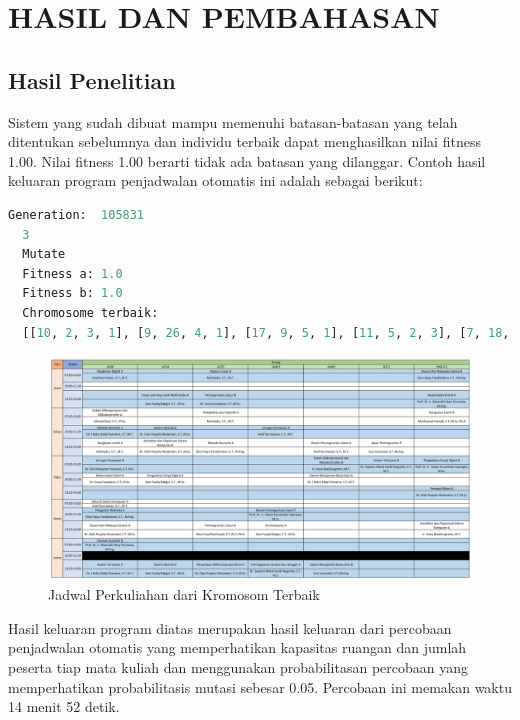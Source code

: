 \chapter{HASIL DAN PEMBAHASAN}
\label{chap:hasilpembahasan}



\section{Hasil Penelitian}
\label{sec:hasil penelitian}
Sistem yang sudah dibuat mampu memenuhi batasan-batasan yang telah ditentukan \linebreak sebelumnya dan individu terbaik dapat menghasilkan nilai fitness 1.00. Nilai fitness 1.00 \linebreak berarti tidak ada batasan yang dilanggar. Contoh hasil keluaran program penjadwalan otomatis ini adalah sebagai berikut:
 
\begin{lstlisting}[language=Python,caption={Output penjadwalan otomatis}]
  Generation:  105831
  3
  Mutate
  Fitness a: 1.0
  Fitness b: 1.0
  Chromosome terbaik: 
  [[10, 2, 3, 1], [9, 26, 4, 1], [17, 9, 5, 1], [11, 5, 2, 3], [7, 18, 3, 3], [6, 12, 5, 3], [10, 25, 3, 4], [15, 32, 4, 4], [12, 28, 5, 4], [2, 35, 2, 5], [3, 16, 4, 5], [9, 10, 6, 5], [9, 6, 7, 6], [14, 1, 1, 6], [17, 14, 3, 6], [2, 4, 2, 6], [10, 27, 4, 6], [13, 37, 1, 7], [4, 33, 7, 7], [5, 22, 5, 7], [1, 11, 4, 7], [11, 21, 2, 8], [7, 13, 4, 8], [3, 30, 7, 8], [2, 24, 5, 9], [9, 29, 4, 10], [17, 20, 4, 11], [5, 7, 6, 11], [16, 17, 3, 12], [11, 38, 6, 12], [4, 3, 5, 12], [2, 8, 4, 12], [6, 15, 4, 13], [11, 34, 2, 14], [3, 36, 4, 14], [14, 31, 7, 14], [13, 19, 6, 14], [2, 23, 3, 14]]
\end{lstlisting}
\begin{figure} [ht] \centering
  \includegraphics[scale=0.6]{gambar/jadwal.jpg}
  \caption{Jadwal Perkuliahan dari Kromosom Terbaik}
  \label{fig:jadwal}
\end{figure}
Hasil keluaran program diatas merupakan hasil keluaran dari percobaan penjadwalan otomatis yang memperhatikan kapasitas ruangan dan jumlah peserta tiap mata kuliah dan menggunakan probabilitasan percobaan yang memperhatikan probabilitasis mutasi sebesar 0.05. Percobaan ini memakan waktu 14 menit 52 detik.


